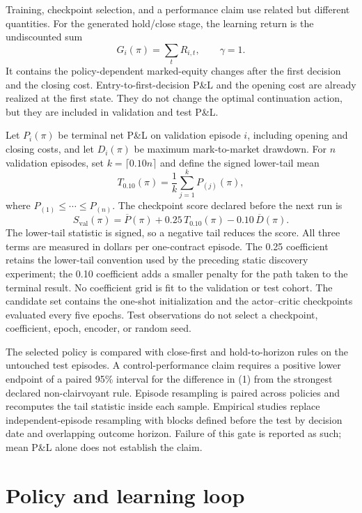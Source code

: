 \documentclass{strategynet-journal}
\begin{document}
\begin{SNcolumns}
Training, checkpoint selection, and a performance claim use related but
different quantities.  For the generated hold/close stage, the learning
return is the undiscounted sum
\[
  G_i(\pi)=\sum_t R_{i,t}, \qquad \gamma=1.
\]
It contains the policy-dependent marked-equity changes after the first
decision and the closing cost.  Entry-to-first-decision P\&L and the opening
cost are already realized at the first state.  They do not change the optimal
continuation action, but they are included in validation and test P\&L.

Let \(P_i(\pi)\) be terminal net P\&L on validation episode \(i\), including
opening and closing costs, and let \(D_i(\pi)\) be maximum mark-to-market
drawdown.  For \(n\) validation episodes, set \(k=\lceil0.10n\rceil\) and
define the signed lower-tail mean
\[
  T_{0.10}(\pi)
  =\frac{1}{k}\sum_{j=1}^{k}P_{(j)}(\pi),
\]
where \(P_{(1)}\leq\cdots\leq P_{(n)}\).  The checkpoint score declared before
the next run is
\[
  S_{\mathrm{val}}(\pi)
  =\overline P(\pi)
   +0.25\,T_{0.10}(\pi)
   -0.10\,\overline D(\pi).
  \tag{1}
\]
The lower-tail statistic is signed, so a negative tail reduces the score.
All three terms are measured in dollars per one-contract episode.  The
0.25 coefficient retains the lower-tail convention used by the preceding
static discovery experiment; the 0.10 coefficient adds a smaller penalty for
the path taken to the terminal result.  No coefficient grid is fit to the
validation or test cohort.  The
candidate set contains the one-shot initialization and the actor--critic
checkpoints evaluated every five epochs.  Test observations do not select a
checkpoint, coefficient, epoch, encoder, or random seed.

The selected policy is compared with close-first and hold-to-horizon rules on
the untouched test episodes.  A control-performance claim requires a positive
lower endpoint of a paired 95\% interval for the difference in (1) from the
strongest declared non-clairvoyant rule.  Episode resampling is paired across
policies and recomputes the tail statistic inside each sample.  Empirical
studies replace independent-episode resampling with blocks defined before the
test by decision date and overlapping outcome horizon.  Failure of this gate
is reported as such; mean P\&L alone does not establish the claim.

\end{SNcolumns}

\section{Policy and learning loop}
\label{sec:policy}
\end{document}
